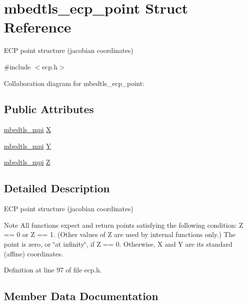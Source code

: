 \hypertarget{structmbedtls__ecp__point}{}\section{mbedtls\+\_\+ecp\+\_\+point Struct Reference}
\label{structmbedtls__ecp__point}


E\+CP point structure (jacobian coordinates)  




{\ttfamily \#include $<$ecp.\+h$>$}



Collaboration diagram for mbedtls\+\_\+ecp\+\_\+point\+:
\subsection*{Public Attributes}
\begin{DoxyCompactItemize}
\item 
\mbox{\hyperlink{structmbedtls__mpi}{mbedtls\+\_\+mpi}} \mbox{\hyperlink{structmbedtls__ecp__point_ac8ab6fd8f0f1173e6da5a4abcff1f0bf}{X}}
\item 
\mbox{\hyperlink{structmbedtls__mpi}{mbedtls\+\_\+mpi}} \mbox{\hyperlink{structmbedtls__ecp__point_af8fb56647185a0186c7a3c54eea30a4d}{Y}}
\item 
\mbox{\hyperlink{structmbedtls__mpi}{mbedtls\+\_\+mpi}} \mbox{\hyperlink{structmbedtls__ecp__point_a83c24649cb4c1ed8aae6449a29d094e5}{Z}}
\end{DoxyCompactItemize}


\subsection{Detailed Description}
E\+CP point structure (jacobian coordinates) 

\begin{DoxyNote}{Note}
All functions expect and return points satisfying the following condition\+: Z == 0 or Z == 1. (Other values of Z are used by internal functions only.) The point is zero, or \char`\"{}at infinity\char`\"{}, if Z == 0. Otherwise, X and Y are its standard (affine) coordinates. 
\end{DoxyNote}


Definition at line 97 of file ecp.\+h.



\subsection{Member Data Documentation}
\mbox{\label{structmbedtls__ecp__point_ac8ab6fd8f0f1173e6da5a4abcff1f0bf}} 
